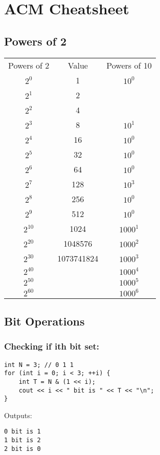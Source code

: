 \documentclass[11pt]{article}
\let\stdsection\section
\renewcommand\section{\newpage\stdsection}
\begin{document}
\section{ACM Cheatsheet}

\subsection{Powers of 2}
\begin{tabular}{ccc}
  Powers of 2 & Value & Powers of 10 \\
  $2^{0}$ & 1 & $10^{0}$ \\
  $2^{1}$ & 2 &  \\
  $2^{2}$ & 4 &  \\
  $2^{3}$ & 8 & $10^{1}$ \\
  $2^{4}$ & 16 & $10^{0}$ \\
  $2^{5}$ & 32 & $10^{0}$ \\
  $2^{6}$ & 64 & $10^{0}$ \\
  $2^{7}$ & 128 & $10^{3}$ \\
  $2^{8}$ & 256 & $10^{0}$ \\
  $2^{9}$ & 512 & $10^{0}$ \\
  $2^{10}$ & 1024 & $1000^{1}$ \\
  $2^{20}$ & 1048576 & $1000^{2}$ \\
  $2^{30}$ & 1073741824 & $1000^{3}$ \\
  $2^{40}$ &  & $1000^{4}$ \\
  $2^{50}$ &  & $1000^{5}$ \\
  $2^{60}$ &  & $1000^{6}$ \\
 \end{tabular}
 
\subsection{Bit Operations}
\subsubsection{Checking if ith bit set:}
\begin{lstlisting}
int N = 3; // 0 1 1
for (int i = 0; i < 3; ++i) {
    int T = N & (1 << i);
	cout << i << " bit is " << T << "\n";
}
\end{lstlisting}

Outputs: 
\begin{lstlisting}
0 bit is 1
1 bit is 2
2 bit is 0
\end{lstlisting}
\end{document}
